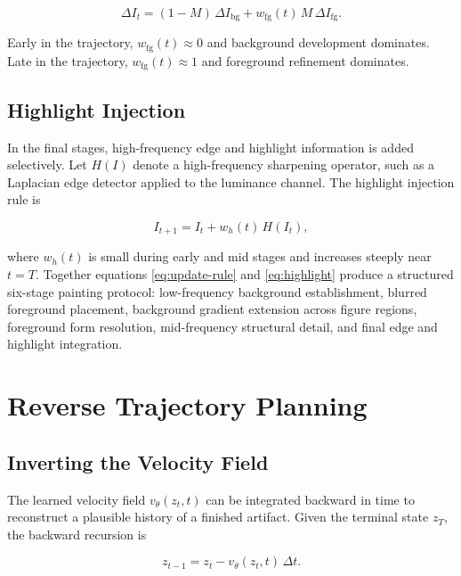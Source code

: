 \documentclass[12pt,a4paper]{article}
\theoremstyle{draftthm}
\newcommand{\vtheta}{v_{\theta}}
\begin{document}
\begin{equation}
  \Delta I_t
  =
  (1 - M)\, \Delta I_{\mathrm{bg}}
  +
  w_{\mathrm{fg}}(t)\, M\, \Delta I_{\mathrm{fg}}.
  \label{eq:update-rule}
\end{equation}

Early in the trajectory, $w_{\mathrm{fg}}(t) \approx 0$ and background development dominates. Late in the trajectory, $w_{\mathrm{fg}}(t) \approx 1$ and foreground refinement dominates.

\subsection{Highlight Injection}

In the final stages, high-frequency edge and highlight information is added selectively. Let $H(I)$ denote a high-frequency sharpening operator, such as a Laplacian edge detector applied to the luminance channel. The highlight injection rule is

\begin{equation}
  I_{t+1} = I_t + w_h(t)\, H(I_t),
  \label{eq:highlight}
\end{equation}

where $w_h(t)$ is small during early and mid stages and increases steeply near $t = T$. Together equations \eqref{eq:update-rule} and \eqref{eq:highlight} produce a structured six-stage painting protocol: low-frequency background establishment, blurred foreground placement, background gradient extension across figure regions, foreground form resolution, mid-frequency structural detail, and final edge and highlight integration.

\section{Reverse Trajectory Planning}

\subsection{Inverting the Velocity Field}

The learned velocity field $\vtheta(z_t, t)$ can be integrated backward in time to reconstruct a plausible history of a finished artifact. Given the terminal state $z_T$, the backward recursion is

\begin{equation}
  z_{t-1} = z_t - \vtheta(z_t, t)\, \Delta t.
  \label{eq:backward-integration}
\end{equation}
\end{document}
